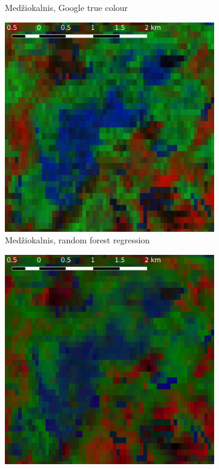 \documentclass[a4paper,12pt]{scrbook}
\begin{document}
\begin{figure}
\begin{subfigure}[t]{.23\textwidth}
    \caption{Med\v{z}iokalnis, Google true colour}
  \end{subfigure} \hfill
  \begin{subfigure}[t]{.23\textwidth}
    \includegraphics[width=\textwidth]{thesis-figures/figures-qgis/medziokalnis-rf}
    \caption{Med\v{z}iokalnis, random forest regression}
    \label{subfig-medziokalnis-rf}
  \end{subfigure} \hfill
  \begin{subfigure}[t]{.23\textwidth}
    \includegraphics[width=\textwidth]{thesis-figures/figures-qgis/medziokalnis-nn}

\end{subfigure}
\end{figure}
\end{document}
